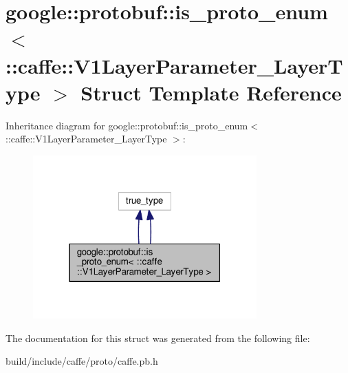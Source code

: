 \hypertarget{structgoogle_1_1protobuf_1_1is__proto__enum_3_01_1_1caffe_1_1_v1_layer_parameter___layer_type_01_4}{}\section{google\+:\+:protobuf\+:\+:is\+\_\+proto\+\_\+enum$<$ \+:\+:caffe\+:\+:V1\+Layer\+Parameter\+\_\+\+Layer\+Type $>$ Struct Template Reference}
\label{structgoogle_1_1protobuf_1_1is__proto__enum_3_01_1_1caffe_1_1_v1_layer_parameter___layer_type_01_4}


Inheritance diagram for google\+:\+:protobuf\+:\+:is\+\_\+proto\+\_\+enum$<$ \+:\+:caffe\+:\+:V1\+Layer\+Parameter\+\_\+\+Layer\+Type $>$\+:
\nopagebreak
\begin{figure}[H]
\begin{center}
\leavevmode
\includegraphics[width=244pt]{structgoogle_1_1protobuf_1_1is__proto__enum_3_01_1_1caffe_1_1_v1_layer_parameter___layer_type_01_4__inherit__graph}
\end{center}
\end{figure}


The documentation for this struct was generated from the following file\+:\begin{DoxyCompactItemize}
\item 
build/include/caffe/proto/caffe.\+pb.\+h\end{DoxyCompactItemize}
